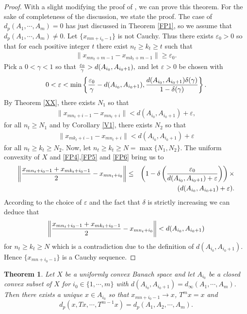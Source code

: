\documentclass{amsart}
\newtheorem{theorem}{Theorem}[section]
\theoremstyle{definition}
\theoremstyle{remark}
\begin{document}
\begin{proof}With a slight modifying the proof of \cite[Theorem 7]{ThSh}, we can prove this theorem. For the sake of completeness of the discussion, we state the proof.  The case of $d_p(A_1,\cdots,A_m)=0$ has just discussed in Theorem \ref{FP1}, so we assume that $d_p(A_1,\cdots,A_m)\neq0.$ Let $\{x_{mn+i_0-1}\}$ is not  Cauchy. Thus there exists $\varepsilon_0>0$ so that for each positive integer $t$ there exist $n_t\geq k_t\geq t$ such that
\begin{eqnarray}\label{FP4}\|x_{mn_t+m-1}-x_{mk_t+m-1}\|\geq\varepsilon_0.\end{eqnarray} Pick a $0<\gamma<1$ so that ${{\varepsilon_0}\over{\gamma}}>d(A_{i_0},A_{i_0+1}),$ and let $\varepsilon>0$ be chosen with
\begin{eqnarray*}
0<\varepsilon<\min\left\{{{\varepsilon_0}\over{\gamma}}-d(A_{i_0},A_{i_0+1}),{{d(A_{i_0},A_{i_0+1})\delta(\gamma)}\over{1-\delta(\gamma)}}\right\}.
\end{eqnarray*}
By Theorem \ref{XX}, there exists $N_1$ so that
\begin{eqnarray}\label{FP5}\|x_{mn_t+i-1}-x_{mn_t+i}\|<d(A_{i_0},A_{i_0+1})+\varepsilon,\end{eqnarray}
for all $n_t\geq N_1$ and by Corollary \ref{V1}, there exists $N_2$ so that
\begin{eqnarray}\label{FP6}\|x_{mk_t+i-1}-x_{mn_t+i}\|<d(A_{i_0},A_{i_0+1})+\varepsilon\end{eqnarray}
for all $n_t\geq k_t\geq N_2$. Now, let $n_t\geq k_t\geq N=\max\{N_1,N_2\}$. The uniform convexity of $X$ and \eqref{FP4},\eqref{FP5} and \eqref{FP6} bring us to
\begin{eqnarray*}
\left\|{{x_{mn_t+i_0-1}+x_{mk_t+i_0-1} }\over{2}}-x_{mn_t+i_0}\right\|&\leq&\left(1-\delta\left({{\varepsilon_0}\over{d(A_{i_0},A_{i_0+1})+\varepsilon}}\right)\right)\times\\&&(d(A_{i_0},A_{i_0+1})+\varepsilon).
\end{eqnarray*}According to the choice of $\varepsilon$ and the fact that $\delta$ is strictly increasing we can deduce that
\begin{eqnarray*}
\left\|{{x_{mn_t+i_0-1}+x_{mk_t+i_0-1} }\over{2}}-x_{mn_t+i_0}\right\|< d(A_{i_0},A_{i_0+1})
\end{eqnarray*} for $n_t\geq k_t\geq N$ which is a contradiction due to the definition of $d(A_{i_0},A_{i_0+1})$. Hence $\{x_{mn+i_0-1}\}$ is a Cauchy sequence.
\end{proof}
\begin{theorem}Let $X$ be a uniformly convex Banach space and let $A_{i_0}$ be a closed convex subset of $X$ for $i_0\in\{1,\cdots,m\}$ with $d(A_{i_0},A_{i_0+1})=d_\infty(A_1,\cdots,A_m)$. Then there exists a unique $x\in A_{i_0}$ so that $x_{mn+i_0-1}\to x$, $T^{m}x=x$ and $$d_p(x,Tx,\cdots,T^{m-1}x)=d_p(A_1,A_2,\cdots,A_m).$$
\end{theorem}
\end{document}
